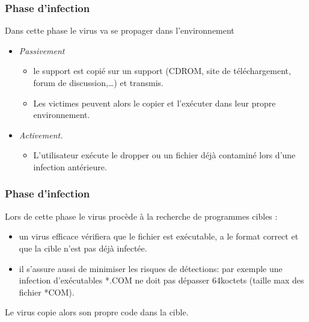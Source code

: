 \documentclass{beamer}
\newcommand{\enlight}[1]{\textit{\color{blue}#1}}
\begin{document}
\begin{frame}
\frametitle{Phase d'infection}

Dans cette phase le virus va se propager dans l'environnement
\begin{itemize}
\item \enlight{Passivement}
\begin{itemize}
\item  le support est copié sur un support (CDROM, site de téléchargement, forum de discussion,\ldots) et transmis.
  \medskip 
\item Les victimes peuvent alors le copier et l'exécuter dans leur propre environnement.
\end{itemize}
\medskip

\item \enlight{Activement.}
\begin{itemize}
\item  L'utilisateur exécute le dropper ou un fichier déjà contaminé lors d'une infection antérieure.
  \end{itemize}
\end{itemize}
\end{frame}

\begin{frame}
\frametitle{Phase d'infection}
Lors de cette phase le virus  procède à la recherche de programmes cibles : %
\begin{itemize}
\item un virus efficace vérifiera que le fichier est exécutable, a le format correct et que la cible n'est pas déjà infectée.
\item il s'assure aussi de minimiser les risques de détections: par exemple une infection d'exécutables *.COM ne doit pas dépasser 64koctets (taille max des fichier *COM).
\end{itemize}

Le virus copie alors son propre code dans la cible.

\end{frame}
\end{document}
